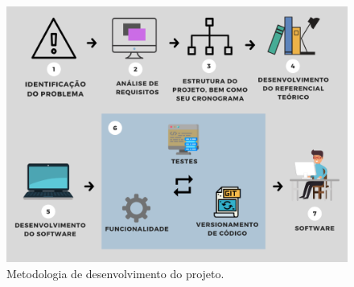 \begin{figure}[h]
	\caption{\label{fig_metodologia-desenvolvimento-tcc}Metodologia de desenvolvimento do projeto.}
	\begin{center}
		\includegraphics[scale=0.5]{5-Metodologia/metodologia-desenvolvimento-tcc.png}
	\end{center}
	\centering {}
\end{figure}